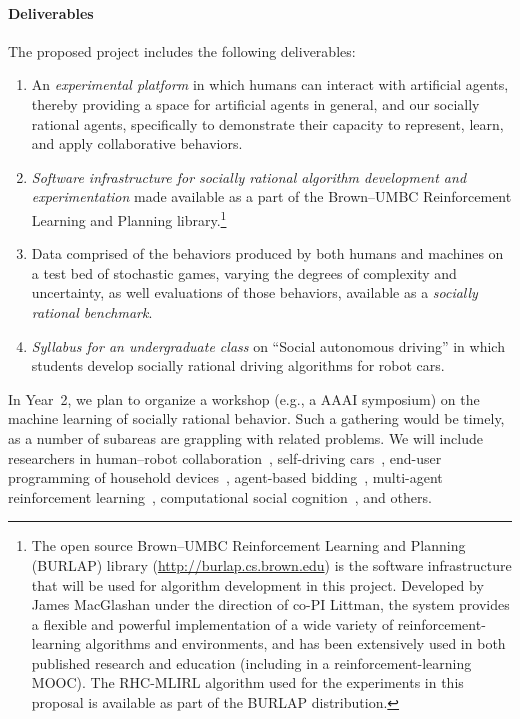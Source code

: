 
\vspace{\up}
\paragraph{Deliverables}

The proposed project includes the following deliverables: 

\begin{enumerate}

\item An {\em experimental platform\/} in which humans can interact
  with artificial agents, thereby providing a space for artificial
  agents in general, and our socially rational agents, specifically to
  demonstrate their capacity to represent, learn, and apply
  collaborative behaviors. %

\item {\em Software infrastructure for socially rational algorithm
  development and experimentation\/} made available as a part of the
  Brown--UMBC Reinforcement Learning and Planning
  library.\footnote{The open source Brown--UMBC Reinforcement Learning
  and Planning (BURLAP) library (\url{http://burlap.cs.brown.edu}) is
  the software infrastructure that will be used for algorithm
  development in this project.  Developed by James MacGlashan under
  the direction of co-PI Littman, the system provides a flexible and
  powerful implementation of a wide variety of reinforcement-learning
  algorithms and environments, and has been extensively used in both
  published research and education (including in a
  reinforcement-learning MOOC).  The RHC-MLIRL algorithm used for the
  experiments in this proposal is available as part of the BURLAP
  distribution.}

\item Data comprised of the behaviors produced by both humans and
  machines on a test bed of stochastic games, varying the degrees of
  complexity and uncertainty, as well evaluations of those behaviors,
  available as a {\em socially rational benchmark}.

\item {\em Syllabus for an undergraduate class} on ``Social autonomous
  driving'' in which students develop socially rational driving
  algorithms for robot cars.

\end{enumerate}

In Year~2, we plan to organize a workshop (e.g., a AAAI symposium)
on the machine learning of socially rational behavior. Such a
gathering would be timely, as a number of subareas are grappling with
related problems. We will include researchers in human--robot
collaboration~\cite{gopalan15}, self-driving
cars~\cite{dolgov2010path}, end-user programming of household
devices~\cite{ur14}, agent-based bidding~\cite{tac:book}, multi-agent
reinforcement learning~\cite{sodomka13}, computational social
cognition~\cite{baker14}, and others.
